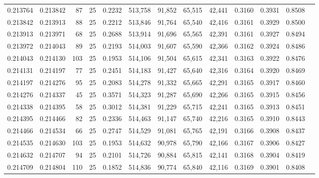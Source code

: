 \begin{tabular}{rrrrrrrrrrrrr}
0.213764 & 0.213842 &    87 &  25 &                                     0.2232 & 513,758 &  91,852 &  65,515 &  42,441 & 0.3160 & 0.3931 & 0.8508 \\
0.213842 & 0.213913 &    88 &  25 &                                     0.2212 & 513,846 &  91,764 &  65,540 &  42,416 & 0.3161 & 0.3929 & 0.8500 \\
0.213913 & 0.213971 &    68 &  25 &                                     0.2688 & 513,914 &  91,696 &  65,565 &  42,391 & 0.3161 & 0.3927 & 0.8494 \\
0.213972 & 0.214043 &    89 &  25 &                                     0.2193 & 514,003 &  91,607 &  65,590 &  42,366 & 0.3162 & 0.3924 & 0.8486 \\
0.214043 & 0.214130 &   103 &  25 &                                     0.1953 & 514,106 &  91,504 &  65,615 &  42,341 & 0.3163 & 0.3922 & 0.8476 \\
0.214131 & 0.214197 &    77 &  25 &                                     0.2451 & 514,183 &  91,427 &  65,640 &  42,316 & 0.3164 & 0.3920 & 0.8469 \\
0.214197 & 0.214276 &    95 &  25 &                                     0.2083 & 514,278 &  91,332 &  65,665 &  42,291 & 0.3165 & 0.3917 & 0.8460 \\
0.214276 & 0.214337 &    45 &  25 &                                     0.3571 & 514,323 &  91,287 &  65,690 &  42,266 & 0.3165 & 0.3915 & 0.8456 \\
0.214338 & 0.214395 &    58 &  25 &                                     0.3012 & 514,381 &  91,229 &  65,715 &  42,241 & 0.3165 & 0.3913 & 0.8451 \\
0.214395 & 0.214466 &    82 &  25 &                                     0.2336 & 514,463 &  91,147 &  65,740 &  42,216 & 0.3165 & 0.3910 & 0.8443 \\
0.214466 & 0.214534 &    66 &  25 &                                     0.2747 & 514,529 &  91,081 &  65,765 &  42,191 & 0.3166 & 0.3908 & 0.8437 \\
0.214535 & 0.214630 &   103 &  25 &                                     0.1953 & 514,632 &  90,978 &  65,790 &  42,166 & 0.3167 & 0.3906 & 0.8427 \\
0.214632 & 0.214707 &    94 &  25 &                                     0.2101 & 514,726 &  90,884 &  65,815 &  42,141 & 0.3168 & 0.3904 & 0.8419 \\
0.214709 & 0.214804 &   110 &  25 &                                     0.1852 & 514,836 &  90,774 &  65,840 &  42,116 & 0.3169 & 0.3901 & 0.8408 \\

\end{tabular}
